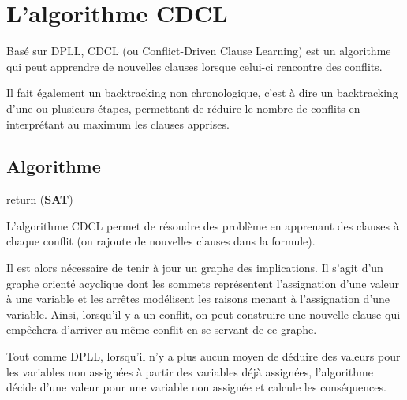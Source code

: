 \documentclass[12pt]{extarticle}
\begin{document}
\newpage
\section{L'algorithme CDCL}

Basé sur DPLL, CDCL (ou Conflict-Driven Clause Learning) est un algorithme qui peut apprendre de nouvelles clauses lorsque celui-ci rencontre des conflits.

Il fait également un backtracking non chronologique, c'est à dire un backtracking d'une ou plusieurs étapes, permettant de réduire le nombre de conflits en interprétant au maximum les clauses apprises.

\subsection{Algorithme}

\begin{algorithm}[H]
 return (\textbf{SAT})
\end{algorithm}

\vspace{2em}

L'algorithme CDCL permet de résoudre des problème en apprenant des clauses à chaque conflit (on rajoute de nouvelles clauses dans la formule).

Il est alors nécessaire de tenir à jour un graphe des implications.
Il s'agit d'un graphe orienté acyclique dont les sommets représentent l'assignation d'une valeur à une variable et les arrêtes modélisent les raisons menant à l'assignation d'une variable.
Ainsi, lorsqu'il y a un conflit, on peut construire une nouvelle clause qui empêchera d'arriver au même conflit en se servant de ce graphe.

Tout comme DPLL, lorsqu'il n'y a plus aucun moyen de déduire des valeurs pour les variables non assignées à partir des variables déjà assignées, l'algorithme décide d'une valeur pour une variable non assignée et calcule les conséquences.
\end{document}
